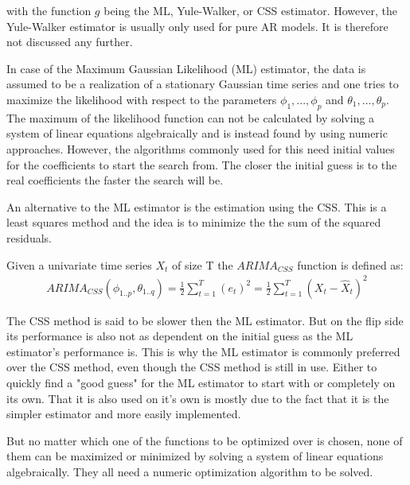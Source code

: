 with the function $g$ being the \acl{ML}, Yule-Walker, or \acl{CSS} estimator. However, the Yule-Walker estimator is usually only used for pure \acl{AR} models.\textsuperscript{\cite[p.~139]{Brockwell2002Introduction2nd}} It is therefore not discussed any further.

In case of the Maximum Gaussian Likelihood (\acs{ML}) estimator, the data is assumed to be a realization of a stationary Gaussian time series and one tries to maximize the likelihood with respect to the parameters $\phi_{1},...,\phi_{p}$ and $\theta_{1},...,\theta_{p}$. The maximum of the likelihood function can not be calculated by solving a system of linear equations algebraically and is instead found by using numeric approaches. However, the algorithms commonly used for this need initial values for the coefficients to start the search from. The closer the initial guess is to the real coefficients the faster the search will be. \textsuperscript{\cite[p.~138]{Brockwell2002Introduction2nd}} 

An alternative to the \acl{ML} estimator is the estimation using the \acl{CSS}. This is a least squares method and the idea is to minimize the the sum of the squared residuals. 

\begin{definition}\label{def:arimacss}
    Given a univariate time series $X_t$ of size T the $ARIMA_{CSS}$ function is defined as:
    \begin{equation}\label{eq:ARIMA_CSS}
        \begin{array}{rcl}
            ARIMA_{CSS}(\phi_{1..p}, \theta_{1..q}) = \frac{1}{2}\displaystyle\sum_{t=1}^{T} (e_t)^2 = \frac{1}{2}\displaystyle\sum_{t=1}^{T} (X_t - \hat{X}_t)^2
        \end{array}
    \end{equation}
\end{definition}

The \acs{CSS} method is said to be slower then the \acl{ML} estimator. But on the flip side its performance is also not as dependent on the initial guess as the \acs{ML} estimator's performance is.
This is why the \acl{ML} estimator is commonly preferred over the \acs{CSS} method,  even though the \acs{CSS} method is still in use. Either to quickly find a "good guess" for the \acs{ML} estimator to start with or completely on its own. That it is also used on it's own is mostly due to the fact that it is the simpler estimator and more easily implemented. 

But no matter which one of the functions to be optimized over is chosen, none of them can be maximized or minimized by solving a system of linear equations algebraically. They all need a numeric optimization algorithm to be solved.

